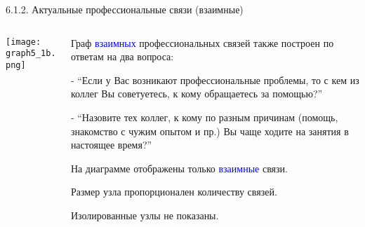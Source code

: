\begin{frame}{6.1.2. Актуальные профессиональные связи (взаимные)}

\begin{columns}
\begin{column}{0.75\textwidth} 
\centering
          \texttt{[image: graph5\_1b.png]}
\end{column}
\begin{column}{0.25\textwidth} 

\tiny
Граф \textcolor{blue}{взаимных} профессиональных связей также построен по ответам на два вопроса:
\smallskip

- ``Если у Вас возникают профессиональные проблемы, то с кем из коллег Вы советуетесь, к кому обращаетесь за помощью?''
\smallskip

- ``Назовите тех коллег, к кому по разным причинам (помощь, знакомство с чужим опытом и пр.) Вы чаще ходите на занятия в настоящее время?''
\smallskip

На диаграмме отображены только \textcolor{blue}{взаимные} связи.
\smallskip

Размер узла пропорционален количеству связей.
\smallskip

Изолированные узлы не показаны.
\end{column}
\end{columns}
\end{frame}


